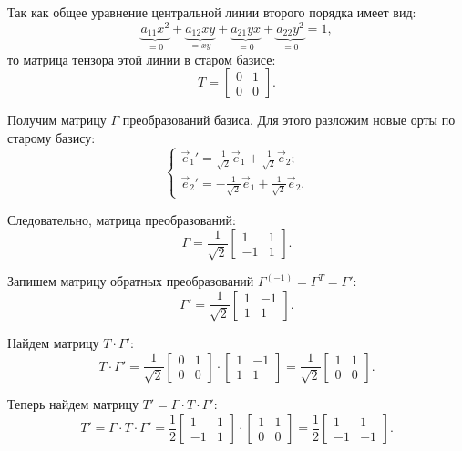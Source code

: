 	\begin{solution}
	
	Так как общее уравнение центральной линии второго порядка имеет вид:
	\[ \underbrace{a_{11}x^2}_{=0} + \underbrace{a_{12}xy}_{=xy} + \underbrace{a_{21}yx}_{=0} + \underbrace{a_{22}y^2}_{=0} = 1, \]
	то матрица тензора этой линии в старом базисе:
	\[ T = \begin{bmatrix}
			0 & 1 \\
			0 & 0
	\end{bmatrix}. \]
	
	Получим матрицу \( \Gamma \) преобразований базиса. Для этого разложим новые орты по старому базису:
	\[ \left\{ \begin{array}{l}
		\vec{e}_1{'} = \frac{1}{\sqrt{2}}\vec{e}_1 + \frac{1}{\sqrt{2}}\vec{e}_2; \\
		\vec{e}_2{'} = -\frac{1}{\sqrt{2}}\vec{e}_1 + \frac{1}{\sqrt{2}}\vec{e}_2.
	\end{array} \right. \]
	
	Следовательно, матрица преобразований:
	\[ \Gamma = \frac{1}{\sqrt{2}} \begin{bmatrix}
			 1 & 1 \\
			-1 & 1
	\end{bmatrix}. \]
	
	Запишем матрицу обратных преобразований \( \Gamma^{(-1)} = \Gamma^T = \Gamma' \):
	\[ \Gamma' = \frac{1}{\sqrt{2}} \begin{bmatrix}
			1 & -1 \\
			1 & 1
	\end{bmatrix}. \]
	
	Найдем матрицу \( T\cdot\Gamma' \):
	\[ T\cdot\Gamma' = \frac{1}{\sqrt{2}} \begin{bmatrix}
			0 & 1 \\
			0 & 0
	\end{bmatrix} \cdot \begin{bmatrix}
			1 & -1 \\
			1 & 1
	\end{bmatrix}  = \frac{1}{\sqrt{2}} \begin{bmatrix}
			1 & 1 \\
			0 & 0
	\end{bmatrix}. \]
	
	Теперь найдем матрицу \( T' = \Gamma\cdot T \cdot\Gamma' \):
	\[ T' = \Gamma\cdot T \cdot\Gamma' = \frac{1}{2} \begin{bmatrix}
			 1 & 1 \\
			-1 & 1
	\end{bmatrix} \cdot \begin{bmatrix}
			1 & 1 \\
			0 & 0
	\end{bmatrix}  = \frac{1}{2} \begin{bmatrix}
			 1 & 1 \\
			-1 & -1
	\end{bmatrix}. \]
	

\end{solution}
